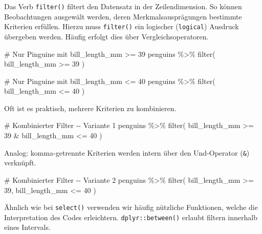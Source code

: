 \documentclass[
  a4paper,
  DIV=11,
  oneside]{scrreprt}
\newenvironment{Shaded}{\begin{snugshade}}{\end{snugshade}}
\newcommand{\NormalTok}[1]{\textcolor[rgb]{0.00,0.23,0.31}{#1}}
\begin{document}
Das Verb \texttt{filter()} filtert den Datensatz in der Zeilendimension.
So können Beobachtungen ausgewält werden, deren Merkmalsausprägungen
bestimmte Kriterien erfüllen. Hierzu muss \texttt{filter()} ein
logischer (\texttt{logical}) Ausdruck übergeben werden. Häufig erfolgt
dies über Vergleichsoperatoren.

\begin{Shaded}
\begin{Highlighting}[]
\NormalTok{\# Nur Pinguine mit bill\_length\_mm \textgreater{}= 39}
\NormalTok{penguins \%\textgreater{}\% }
\NormalTok{  filter(}
\NormalTok{    bill\_length\_mm \textgreater{}= 39}
\NormalTok{  )}
\end{Highlighting}
\end{Shaded}

\begin{Shaded}
\begin{Highlighting}[]
\NormalTok{\# Nur Pinguine mit bill\_length\_mm \textless{}= 40}
\NormalTok{penguins \%\textgreater{}\% }
\NormalTok{  filter(}
\NormalTok{    bill\_length\_mm \textless{}= 40}
\NormalTok{  )}
\end{Highlighting}
\end{Shaded}

Oft ist es praktisch, mehrere Kriterien zu kombinieren.

\begin{Shaded}
\begin{Highlighting}[]
\NormalTok{\# Kombinierter Filter {-}{-} Variante 1}
\NormalTok{penguins \%\textgreater{}\% }
\NormalTok{  filter(}
\NormalTok{    bill\_length\_mm \textgreater{}= 39 \& bill\_length\_mm \textless{}= 40}
\NormalTok{  )}
\end{Highlighting}
\end{Shaded}

Analog: komma-getrennte Kriterien werden intern über den Und-Operator
(\texttt{\&}) verknüpft.

\begin{Shaded}
\begin{Highlighting}[]
\NormalTok{\# Kombinierter Filter {-}{-} Variante 2}
\NormalTok{penguins \%\textgreater{}\% }
\NormalTok{  filter(}
\NormalTok{    bill\_length\_mm \textgreater{}= 39, }
\NormalTok{    bill\_length\_mm \textless{}= 40}
\NormalTok{  )}
\end{Highlighting}
\end{Shaded}

Ähnlich wie bei \texttt{select()} verwenden wir häufig nützliche
Funktionen, welche die Interpretation des Codes erleichtern.
\texttt{dplyr::between()} erlaubt filtern innerhalb eines Intervals.
\end{document}
